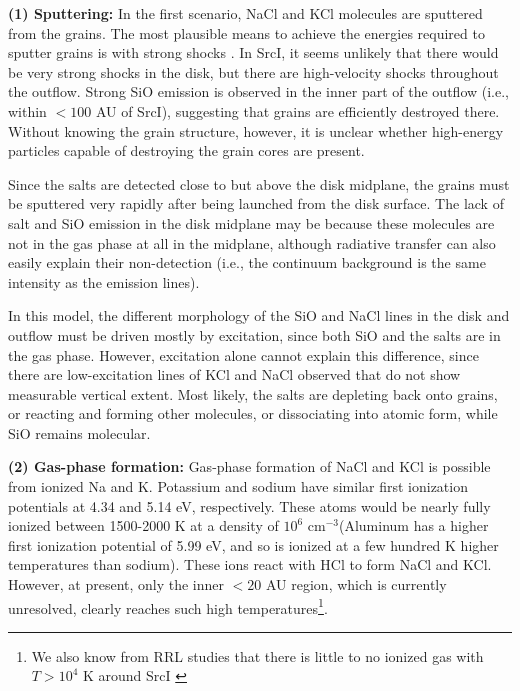 \documentclass[12pt]{article}
\newcommand{\sourcei}{SrcI\xspace}
\newcommand{\percc}{\ensuremath{\textrm{cm}^{-3}}\xspace}
\begin{document}
\textbf{(1) Sputtering:}
In the first scenario, NaCl and KCl molecules are sputtered from the grains.
The most plausible means to achieve the energies required to sputter grains is
with strong shocks \cite{Schilke1997a,Decin2016a}.  In \sourcei, it seems
unlikely that there would be very strong shocks in the disk, but there are
high-velocity shocks throughout the outflow. Strong SiO emission is observed in
the inner part of the outflow (i.e., within $<100$ AU of \sourcei), suggesting
that grains are efficiently destroyed there.  Without knowing the grain
structure, however, it is unclear whether high-energy particles capable of
destroying the grain cores are present.

Since the salts are detected close to but above the disk midplane, the
grains must be sputtered very rapidly after being launched from the disk surface.
The lack of salt and SiO emission in the disk midplane may be because these
molecules are not in the gas phase at all in the midplane, although radiative
transfer can also easily explain their non-detection (i.e., the continuum
background is the same intensity as the emission lines).

In this model, the different morphology of the SiO and NaCl lines in the disk
and outflow must be driven mostly by excitation, since both SiO and the salts are
in the gas phase.  However, excitation alone cannot explain this difference,
since there are low-excitation lines of KCl and NaCl observed that do not
show measurable vertical extent.  Most likely, the salts are depleting back onto
grains, or reacting and forming other molecules, or dissociating into 
atomic form, while SiO remains molecular.



\textbf{(2) Gas-phase formation:}
Gas-phase formation of NaCl and KCl is possible from ionized Na and K.
Potassium and sodium have similar first ionization potentials at 4.34 and 5.14
eV, respectively.  These atoms would be nearly fully ionized between 1500-2000
K at a density of $10^6$ \percc (Aluminum has a higher first ionization
potential of 5.99 eV, and so is ionized at a few hundred K higher temperatures
than sodium).  These ions react with HCl to form NaCl and KCl.  However, at
present, only the inner $<20$ AU region, which is currently unresolved, clearly
reaches such high temperatures\footnote{We also know from RRL studies that
there is little to no ionized gas with $T>10^4$ K around \sourcei
\cite{Plambeck2016a,Baez-Rubio2018a}}.  
\end{document}
